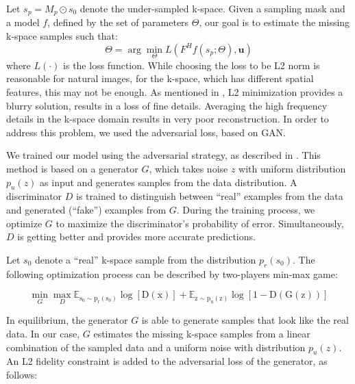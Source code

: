 \documentclass[review]{elsarticle}
\begin{document}
Let $s_{p}=M_{p}\odot s_{0}$ denote the under-sampled k-space. Given a sampling mask and a model $f$, defined by the set of parameters $\Theta$, our goal is to estimate the missing k-space samples such that: 
\begin{equation}
\Theta=\arg\min_{\Theta}L(F^{H}f\left(s_{p};\Theta\right),\boldsymbol{u})
\end{equation}
where $L\left(\cdot\right)$ is the loss function. While choosing the loss to be L2 norm is reasonable for natural images, for the k-space, which has different spatial features, this may not be enough. As mentioned in \cite{pathak2016context}, L2 minimization provides a blurry solution, results in a loss of fine details. 
Averaging the high frequency details in the k-space domain results in very poor reconstruction. In order to address this problem, we used the adversarial loss, based on GAN.

We trained our model using the adversarial strategy, as described in \cite{goodfellow2014generative,radford2015unsupervised}. 
This method is based on a generator $G$, which takes noise \textbf{$z$ }with uniform distribution \textbf{$p_{u}\left(z\right)$} as input and generates samples from the data distribution. A discriminator $D$ is trained to distinguish between ``real'' examples from the data and generated (``fake'') examples from $G.$ During the training process, we optimize $G$ to maximize the discriminator's probability of error. Simultaneously, $D$ is getting better and provides more
accurate predictions.

Let $s_{0}$ denote a ``real'' k-space sample from the distribution $p_{r}\left(s_{0}\right)$. The following optimization process can be described by two-players min-max game:

\begin{equation}
\min_{G}\max_{D}\mathbb{E_{\mathrm{s_{0}\sim p_{r}\left(s_{0}\right)}}\mathrm{\log\left[D\left(x\right)\right]}}+\mathbb{E_{\mathrm{z\sim p_{u}\left(z\right)}}\mathrm{\log\left[1-D\left(G(z)\right)\right]}}
\end{equation}

In equilibrium, the generator $G$ is able to generate samples that look like the real data. In our case, $G$ estimates the missing k-space samples from a linear combination of the sampled data and a uniform noise with distribution $p_{u}\left(z\right)$. An L2 fidelity constraint is added to the adversarial loss of the generator, as follows:
\end{document}
